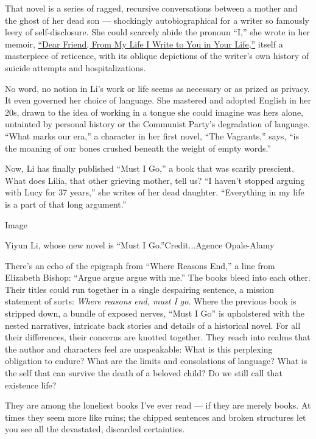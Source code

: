 That novel is a series of ragged, recursive conversations between a
mother and the ghost of her dead son --- shockingly autobiographical for
a writer so famously leery of self-disclosure. She could scarcely abide
the pronoun ``I,'' she wrote in her memoir,
\href{https://www.nytimes.com/2017/02/15/books/review/dear-friend-from-my-life-i-write-to-you-in-your-life-yiyun-li.html}{``Dear
Friend, From My Life I Write to You in Your Life,''} itself a
masterpiece of reticence, with its oblique depictions of the writer's
own history of suicide attempts and hospitalizations.

No word, no notion in Li's work or life seems as necessary or as prized
as privacy. It even governed her choice of language. She mastered and
adopted English in her 20s, drawn to the idea of working in a tongue she
could imagine was hers alone, untainted by personal history or the
Communist Party's degradation of language. ``What marks our era,'' a
character in her first novel, ``The Vagrants,'' says, ``is the moaning
of our bones crushed beneath the weight of empty words.''

Now, Li has finally published ``Must I Go,'' a book that was scarily
prescient. What does Lilia, that other grieving mother, tell us? ``I
haven't stopped arguing with Lucy for 37 years,'' she writes of her dead
daughter. ``Everything in my life is a part of that long argument.''

Image

Yiyun Li, whose new novel is ``Must I Go.''Credit...Agence Opale-Alamy

There's an echo of the epigraph from ``Where Reasons End,'' a line from
Elizabeth Bishop: ``Argue argue argue with me.'' The books bleed into
each other. Their titles could run together in a single despairing
sentence, a mission statement of sorts: \emph{Where reasons end, must I
go}. Where the previous book is stripped down, a bundle of exposed
nerves, ``Must I Go'' is upholstered with the nested narratives,
intricate back stories and details of a historical novel. For all their
differences, their concerns are knotted together. They reach into realms
that the author and characters feel are unspeakable: What is this
perplexing obligation to endure? What are the limits and consolations of
language? What is the self that can survive the death of a beloved
child? Do we still call that existence life?

They are among the loneliest books I've ever read --- if they are merely
books. At times they seem more like ruins; the chipped sentences and
broken structures let you see all the devastated, discarded certainties.

